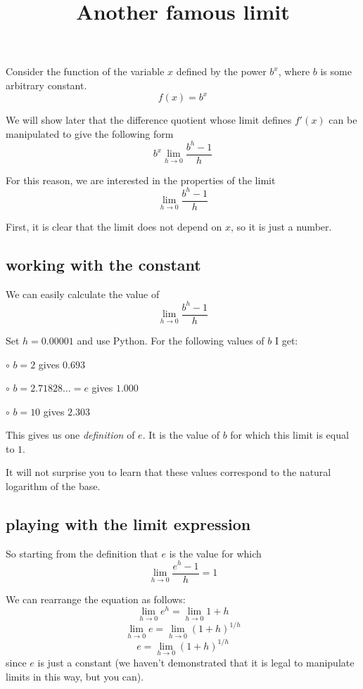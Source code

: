 \documentclass[11pt, oneside]{article}
\title{Another famous limit}
\date{}
\begin{document}
\maketitle
\Large

Consider the function of the variable $x$ defined by the power $b^x$, where $b$ is some arbitrary constant.
\[ f(x) = b^x \]

We will show later that the difference quotient whose limit defines $f'(x)$ can be manipulated to give the following form
\[ b^x \lim_{h \rightarrow 0} \frac{b^{h}-1}{h} \]

For this reason, we are interested in the properties of the limit
\[ \lim_{h \rightarrow 0} \frac{b^{h}-1}{h} \]

First, it is clear that the limit does not depend on $x$, so it is just a number.

\subsection*{working with the constant}

We can easily calculate the value of
\[ \lim_{h \rightarrow 0} \frac{b^{h}-1}{h} \]

Set $h=0.00001$ and use Python.  For the following values of $b$ I get:

$\circ$  $b=2$ gives $0.693$

$\circ$  $b=2.71828 \dots = e$ gives $1.000$

$\circ$  $b=10$ gives $2.303$

This gives us one \emph{definition} of $e$.  It is the value of $b$ for which this limit is equal to $1$.

It will not surprise you to learn that these values correspond to the natural logarithm of the base.

\subsection*{playing with the limit expression}

So starting from the definition that $e$ is the value for which
\[ \lim_{h \rightarrow 0} \frac{e^{h}-1}{h} = 1 \]

We can rearrange the equation as follows:
\[ \lim_{h \rightarrow 0} e^{h} = \lim_{h \rightarrow 0} 1 + h \]
\[ \lim_{h \rightarrow 0}  e = \lim_{h \rightarrow 0} (1 + h)^{1/h} \]
\[ e = \lim_{h \rightarrow 0} (1 + h)^{1/h} \]
since $e$ is just a constant (we haven't demonstrated that it is legal to manipulate limits in this way, but you can).
\end{document}
